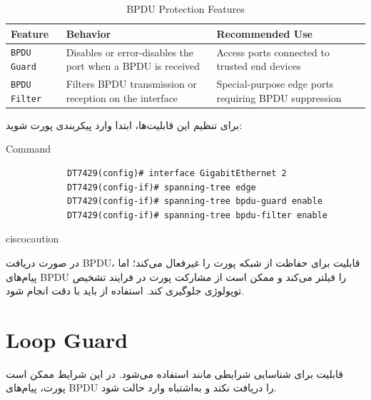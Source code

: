 \documentclass[11pt,letterpaper]{report}
\newenvironment{cautionbox}[1]{%
	\begin{noticebox}[title={\textbf{\faExclamationTriangle\ #1}}]{ciscocaution}
	}{%
	\end{noticebox}
}
\begin{document}
	\begin{table}[htbp]
		\centering
		\caption{BPDU Protection Features}
		\label{tab:bpdu-protection}
		\begin{tabular}{|p{3.0cm}|p{5.0cm}|p{4.7cm}|}
			\hline
			\textbf{Feature} &
			\textbf{Behavior} &
			\textbf{Recommended Use} \\
			\hline
			\texttt{BPDU Guard} &
			Disables or error-disables the port when a BPDU is received &
			Access ports connected to trusted end devices \\
			\hline
			\texttt{BPDU Filter} &
			Filters BPDU transmission or reception on the interface &
			Special-purpose edge ports requiring BPDU suppression \\
			\hline
		\end{tabular}
	\end{table}

	برای تنظیم این قابلیت‌ها، ابتدا وارد پیکربندی پورت شوید:

	\begin{latin}
		\begin{cliexample}{Command}
			\begin{verbatim}
			DT7429(config)# interface GigabitEthernet 2
			DT7429(config-if)# spanning-tree edge
			DT7429(config-if)# spanning-tree bpdu-guard enable
			DT7429(config-if)# spanning-tree bpdu-filter enable
			\end{verbatim}
		\end{cliexample}
	\end{latin}

	\begin{cautionbox}{تفاوت BPDU Guard و BPDU Filter}
		در صورت دریافت BPDU، قابلیت  برای حفاظت از شبکه
		پورت را غیرفعال می‌کند؛ اما  پیام‌های BPDU را
		فیلتر می‌کند و ممکن است از مشارکت پورت در فرایند تشخیص توپولوژی
		جلوگیری کند. استفاده از  باید با دقت انجام شود.
	\end{cautionbox}


	\section{Loop Guard}

	قابلیت  برای شناسایی شرایطی مانند
	 استفاده می‌شود. در این شرایط ممکن است
	پورت، پیام‌های BPDU را دریافت نکند و به‌اشتباه وارد حالت
	 شود.
\end{document}
